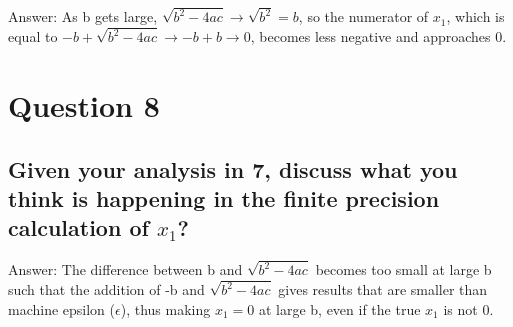 \documentclass{article}
\begin{document}
Answer: As b gets large, $\sqrt{b^{2}-4ac} \rightarrow \sqrt{b^{2}} = b$, so the numerator of $x_1$, which is equal to $-b+\sqrt{b^{2}-4ac} \rightarrow -b + b \rightarrow 0$, becomes less negative and approaches 0.


\section*{Question 8}
\subsection*{Given your analysis in 7, discuss what you think is happening in
             the finite precision calculation of $x_1$?}

Answer: The difference between b and $\sqrt{b^{2}-4ac}$ becomes too small at large b such that the addition of -b and $\sqrt{b^{2}-4ac}$ gives results that are smaller than machine epsilon ($\epsilon$), thus making $x_1=0$ at large b, even if the true $x_1$ is not 0.
\end{document}
